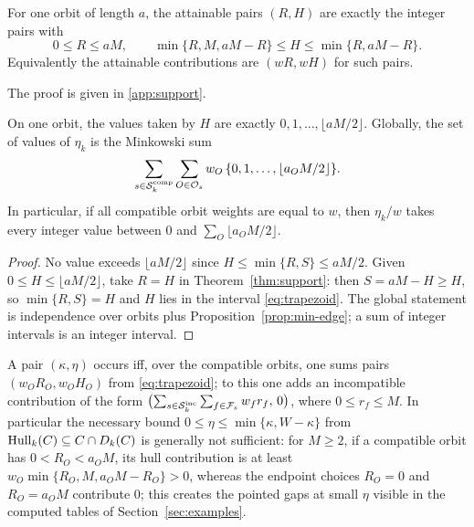 \begin{theorem}\label{thm:support}
For one orbit of length $a$, the attainable pairs $(R,H)$ are exactly the
integer pairs with
{\footnotesize
\begin{equation}\label{eq:trapezoid}
0\leq R\leq aM,\qquad
\min\{R,M,aM-R\}\leq H\leq\min\{R,aM-R\}.
\end{equation}
}
Equivalently the attainable contributions are $(wR,wH)$ for such pairs.
\end{theorem}

\noindent The proof is given in \ref{app:support}.



\begin{corollary}\label{cor:hull-values}
On one orbit, the values taken by $H$ are exactly
$0,1,\ldots,\lfloor aM/2\rfloor$.  Globally, the set of values of $\eta_k$ is
the Minkowski sum
\[
\sum_{s\in\mathcal{S}_k^{\mathrm{comp}}}\sum_{O\in\mathcal O_s}
 w_O\,\{0,1,\ldots,\lfloor a_OM/2\rfloor\}.
\]
In particular, if all compatible orbit weights are equal to $w$, then
$\eta_k/w$ takes every integer value between $0$ and
$\sum_O\lfloor a_OM/2\rfloor$.
\end{corollary}

\begin{proof}
No value exceeds $\lfloor aM/2\rfloor$ since
$H\leq\min\{R,S\}\leq aM/2$.  Given $0\leq H\leq\lfloor aM/2\rfloor$, take
$R=H$ in Theorem~\ref{thm:support}: then $S=aM-H\geq H$, so
$\min\{R,S\}=H$ and $H$ lies in the interval \eqref{eq:trapezoid}.  The global
statement is independence over orbits plus Proposition~\ref{prop:min-edge};
a sum of integer intervals is an integer interval.
\end{proof}

\begin{corollary}\label{cor:global-support}
A pair $(\kappa,\eta)$ occurs iff, over the compatible orbits, one sums
pairs $(w_OR_O,w_OH_O)$ from \eqref{eq:trapezoid}; to this one adds an
incompatible contribution of the form
$\bigl(\sum_{s\in\mathcal{S}_k^{\mathrm{inc}}}\sum_{f\in\mathcal F_s}w_fr_f,\,0\bigr)$,
where $0\leq r_f\leq M$.  In particular the
necessary bound $0\leq\eta\leq\min\{\kappa,W-\kappa\}$ from
$\operatorname{Hull}_k(C)\subseteq C\cap D_k(C)$ is generally not sufficient: for $M\geq2$,
if a compatible orbit has $0<R_O<a_OM$, its hull contribution is at least
$w_O\min\{R_O,M,a_OM-R_O\}>0$, whereas the endpoint choices $R_O=0$ and
$R_O=a_OM$ contribute $0$; this creates the
pointed gaps at small $\eta$ visible in the computed tables of
Section~\ref{sec:examples}.
\end{corollary}

